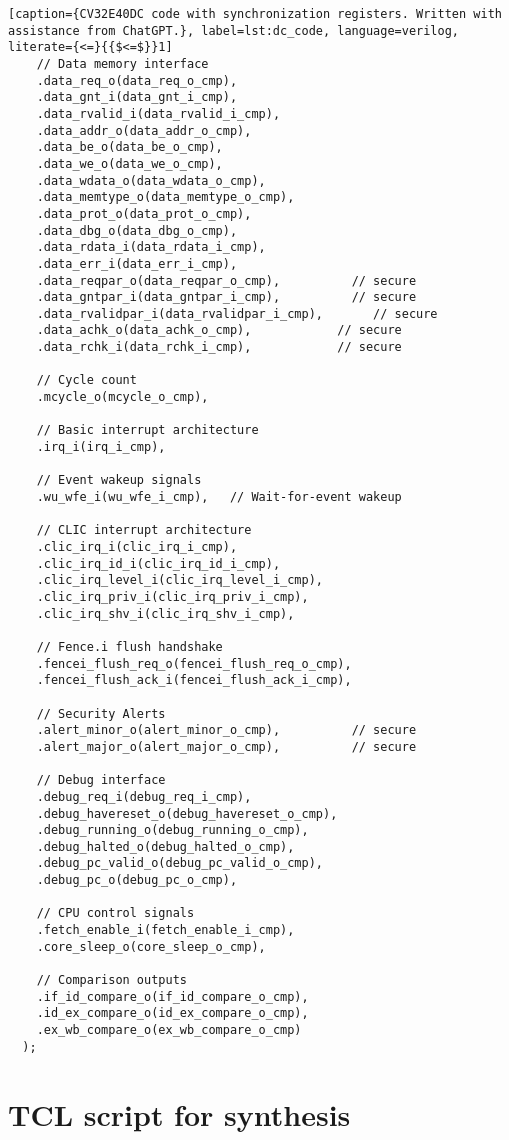 \begin{lstlisting}[caption={CV32E40DC code with synchronization registers. Written with assistance from ChatGPT.}, label=lst:dc_code, language=verilog, literate={<=}{{$<=$}}1]
    // Data memory interface
    .data_req_o(data_req_o_cmp),
    .data_gnt_i(data_gnt_i_cmp),
    .data_rvalid_i(data_rvalid_i_cmp),
    .data_addr_o(data_addr_o_cmp),
    .data_be_o(data_be_o_cmp),
    .data_we_o(data_we_o_cmp),
    .data_wdata_o(data_wdata_o_cmp),
    .data_memtype_o(data_memtype_o_cmp),
    .data_prot_o(data_prot_o_cmp),
    .data_dbg_o(data_dbg_o_cmp),
    .data_rdata_i(data_rdata_i_cmp),
    .data_err_i(data_err_i_cmp),
    .data_reqpar_o(data_reqpar_o_cmp),          // secure
    .data_gntpar_i(data_gntpar_i_cmp),          // secure
    .data_rvalidpar_i(data_rvalidpar_i_cmp),       // secure
    .data_achk_o(data_achk_o_cmp),            // secure
    .data_rchk_i(data_rchk_i_cmp),            // secure

    // Cycle count
    .mcycle_o(mcycle_o_cmp),

    // Basic interrupt architecture
    .irq_i(irq_i_cmp),

    // Event wakeup signals
    .wu_wfe_i(wu_wfe_i_cmp),   // Wait-for-event wakeup

    // CLIC interrupt architecture
    .clic_irq_i(clic_irq_i_cmp),
    .clic_irq_id_i(clic_irq_id_i_cmp),
    .clic_irq_level_i(clic_irq_level_i_cmp),
    .clic_irq_priv_i(clic_irq_priv_i_cmp),
    .clic_irq_shv_i(clic_irq_shv_i_cmp),

    // Fence.i flush handshake
    .fencei_flush_req_o(fencei_flush_req_o_cmp),
    .fencei_flush_ack_i(fencei_flush_ack_i_cmp),

    // Security Alerts
    .alert_minor_o(alert_minor_o_cmp),          // secure
    .alert_major_o(alert_major_o_cmp),          // secure

    // Debug interface
    .debug_req_i(debug_req_i_cmp),
    .debug_havereset_o(debug_havereset_o_cmp),
    .debug_running_o(debug_running_o_cmp),
    .debug_halted_o(debug_halted_o_cmp),
    .debug_pc_valid_o(debug_pc_valid_o_cmp),
    .debug_pc_o(debug_pc_o_cmp),

    // CPU control signals
    .fetch_enable_i(fetch_enable_i_cmp),
    .core_sleep_o(core_sleep_o_cmp),

    // Comparison outputs
    .if_id_compare_o(if_id_compare_o_cmp),
    .id_ex_compare_o(id_ex_compare_o_cmp),
    .ex_wb_compare_o(ex_wb_compare_o_cmp)
  );

\end{lstlisting}

\section{TCL script for synthesis}
\label{app:synth_tcl}

